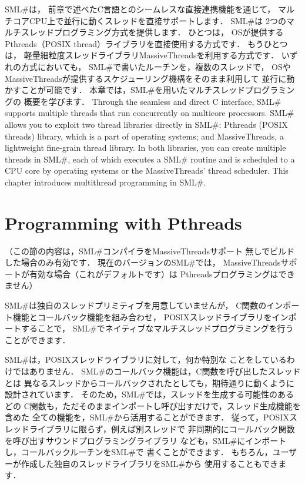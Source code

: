 \documentclass{jbook}
\newcommand{\txt}[2]{#2}
\newcommand{\smlsharp}{SML\#}
\begin{document}
\ifjp%
	\smlsharp{}は，
前章で述べたC言語とのシームレスな直接連携機能を通じて，
マルチコアCPU上で並行に動くスレッドを直接サポートします．
	\smlsharp{}は
2つのマルチスレッドプログラミング方式を提供します．
	ひとつは，
OSが提供するPthreads（POSIX thread）ライブラリを直接使用する方式です．
	もうひとつは，
軽量細粒度スレッドライブラリMassiveThreadsを利用する方式です．
	いずれの方式においても，
\smlsharp{}で書いたルーチンを，複数のスレッドで，
OSやMassiveThreadsが提供するスケジューリング機構をそのまま利用して
並行に動かすことが可能です．
	本章では，\smlsharp{}を用いたマルチスレッドプログラミングの
概要を学びます．
\else%
	Through the seamless and direct C interface,
\smlsharp{} supports multiple threads that run concurrently on
multicore processors.
	\smlsharp{} allows you to exploit
two thread libraries directly in \smlsharp{}:
Pthreads (POSIX threads) library, which is a part of operating systems;
and MassiveThreads, a lightweight fine-grain thread library.
	In both libraries,
you can create multiple threads in \smlsharp{}, each of which
executes a \smlsharp{} routine and is scheduled to a CPU core
by operating systems or the MassiveThreads' thread scheduler.
	This chapter introduces multithread programming in \smlsharp{}.
\fi%


\section{\txt{Pthreadsプログラミング}
{Programming with Pthreads}}

\ifjp%
	（この節の内容は，\smlsharp{}コンパイラをMassiveThreadsサポート
無しでビルドした場合のみ有効です．
	現在のバージョンの\smlsharp{}では，
MassiveThreadsサポートが有効な場合（これがデフォルトです）は
Pthreadsプログラミングはできません）

	\smlsharp{}は独自のスレッドプリミティブを用意していませんが，
C関数のインポート機能とコールバック機能を組み合わせ，
POSIXスレッドライブラリをインポートすることで，
\smlsharp{}でネイティブなマルチスレッドプログラミングを行うことができます．

	\smlsharp{}は，POSIXスレッドライブラリに対して，何か特別な
ことをしているわけではありません．
	\smlsharp{}のコールバック機能は，C関数を呼び出したスレッドとは
異なるスレッドからコールバックされたとしても，期待通りに動くように
設計されています．
	そのため，\smlsharp{}では，スレッドを生成する可能性のあるどの
C関数も，ただそのままインポートし呼び出すだけで，スレッド生成機能を含めた
全ての機能を，\smlsharp{}から活用することができます．
	従って，POSIXスレッドライブラリに限らず，例えば別スレッドで
非同期的にコールバック関数を呼び出すサウンドプログラミングライブラリ
なども，\smlsharp{}にインポートし，コールバックルーチンを\smlsharp{}で
書くことができます．
	もちろん，ユーザーが作成した独自のスレッドライブラリを\smlsharp{}から
使用することもできます．
\end{document}
